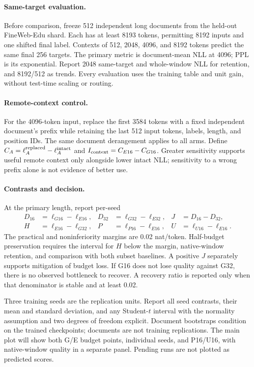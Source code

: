 \paragraph{Same-target evaluation.}
Before comparison, freeze 512 independent long documents from the held-out
FineWeb-Edu shard. Each has at least 8193 tokens, permitting 8192 inputs and
one shifted final label. Contexts of 512, 2048, 4096, and 8192 tokens predict
the same final 256 targets. The primary metric is document-mean NLL at 4096;
PPL is its exponential. Report 2048 same-target and whole-window NLL for
retention, and 8192/512 as trends. Every evaluation uses the training table
and unit gain, without test-time scaling or routing.

\paragraph{Remote-context control.}
For the 4096-token input, replace the first 3584 tokens with a fixed independent
document's prefix while retaining the last 512 input tokens, labels, length,
and position IDs. The same document derangement applies to all arms. Define
$C_A=\ell_A^{\rm replaced}-\ell_A^{\rm intact}$ and
$I_{\rm context}=C_{E16}-C_{G16}$. Greater sensitivity supports useful remote
context only alongside lower intact NLL; sensitivity to a wrong prefix alone
is not evidence of better use.

\paragraph{Contrasts and decision.}
At the primary length, report per-seed
\begin{align}
D_{16}&=\ell_{G16}-\ell_{E16},&D_{32}&=\ell_{G32}-\ell_{E32},&J&=D_{16}-D_{32},\\
H&=\ell_{E16}-\ell_{G32},&P&=\ell_{P16}-\ell_{E16},&U&=\ell_{U16}-\ell_{E16}.
\end{align}
The practical and noninferiority margins are 0.02 nat/token. Half-budget
preservation requires the interval for $H$ below the margin, native-window
retention, and comparison with both subset baselines. A positive $J$ separately
supports mitigation of budget loss. If G16 does not lose quality against G32,
there is no observed bottleneck to recover. A recovery ratio is reported only
when that denominator is stable and at least 0.02.

Three training seeds are the replication units. Report all seed contrasts,
their mean and standard deviation, and any Student-$t$ interval with the
normality assumption and two degrees of freedom explicit. Document bootstraps
condition on the trained checkpoints; documents are not training replications.
The main plot will show both G/E budget points, individual seeds, and P16/U16,
with native-window quality in a separate panel. Pending runs are not plotted
as predicted scores.

